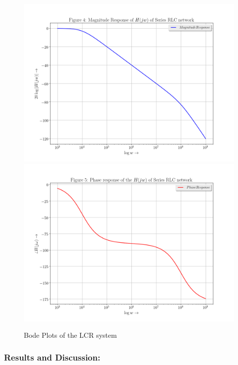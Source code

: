 \documentclass[11pt, a4paper]{article}
\begin{document}
\begin{figure}[!tbh]

  \centering
\includegraphics[scale=0.4]{./../Extras/A64.png}  %
\includegraphics[scale=0.4]{./../Extras/A65.png}  %

\caption{Bode Plots of the LCR system}
\end{figure}

\newpage
\subsubsection{Results and Discussion:}\label{results-and-discussion}
\end{document}
